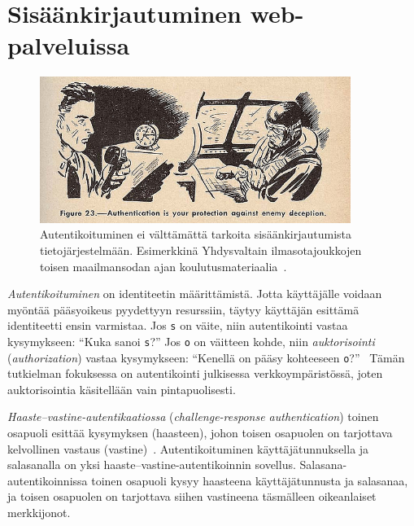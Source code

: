 \documentclass[finnish,gradu]{tktltiki}
\begin{document}


\newpage
\section{Sisäänkirjautuminen web-palveluissa} %
\label{sec:autentikoituminen_ja_web}

  \begin{figure}[h!]
    \centering
    \includegraphics[width=0.9\textwidth]{images/usnavy_authentication.jpg}
    \caption[Autentikoituminen on tunnistautumista.]{Autentikoituminen ei välttämättä tarkoita sisäänkirjautumista tietojärjestelmään. Esimerkkinä Yhdysvaltain ilmasotajoukkojen toisen maailmansodan ajan koulutusmateriaalia~\cite{usnavy_authentication}.}
    \label{fig:autentikointi_suojaa_viholliselta}
  \end{figure}


  \emph{Autentikoituminen} on identiteetin määrittämistä. Jotta käyttäjälle voidaan myöntää pääsyoikeus pyydettyyn resurssiin, täytyy käyttäjän esittämä identiteetti ensin varmistaa. Jos \verb#s# on väite, niin autentikointi vastaa kysymykseen: ``Kuka sanoi \verb#s#?'' Jos \verb#o# on väitteen kohde, niin \emph{auktorisointi} (\emph{authorization}) vastaa kysymykseen: ``Kenellä on pääsy kohteeseen \verb#o#?''~\cite{lampson_distributed_1992} Tämän tutkielman fokuksessa on autentikointi julkisessa verkkoympäristössä, joten auktorisointia käsitellään vain pintapuolisesti.

  \emph{Haaste--vastine-autentikaatiossa} (\emph{challenge-response authentication}) toinen osapuoli esittää kysymyksen (haasteen), johon toisen osapuolen on tarjottava kelvollinen vastaus (vastine)~\cite{NIST_SP800-63-1}. Autentikoituminen käyttäjätunnuksella ja salasanalla on yksi haaste--vastine-autentikoinnin sovellus. Salasana-autentikoinnissa toinen osapuoli kysyy haasteena käyttäjätunnusta ja salasanaa, ja toisen osapuolen on tarjottava siihen vastineena täsmälleen oikeanlaiset merkkijonot.
\end{document}
